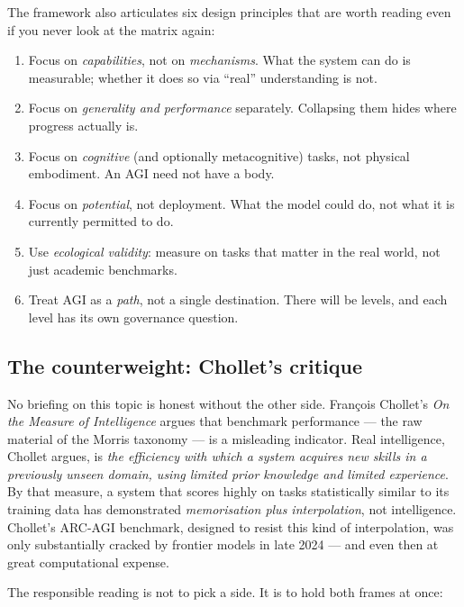 \documentclass[11pt,a4paper]{article}
\begin{document}
The framework also articulates six design principles that are worth
reading even if you never look at the matrix again:

\begin{enumerate}[leftmargin=1.4em]
  \item Focus on \emph{capabilities}, not on \emph{mechanisms}. What
        the system can do is measurable; whether it does so via
        ``real'' understanding is not.
  \item Focus on \emph{generality and performance} separately.
        Collapsing them hides where progress actually is.
  \item Focus on \emph{cognitive} (and optionally metacognitive) tasks,
        not physical embodiment. An AGI need not have a body.
  \item Focus on \emph{potential}, not deployment. What the model could
        do, not what it is currently permitted to do.
  \item Use \emph{ecological validity}: measure on tasks that matter in
        the real world, not just academic benchmarks.
  \item Treat AGI as a \emph{path}, not a single destination. There
        will be levels, and each level has its own governance question.
\end{enumerate}

\subsection{The counterweight: Chollet's critique}

No briefing on this topic is honest without the other side. Fran\c{c}ois
Chollet's \emph{On the Measure of Intelligence} \citep{chollet2019measure}
argues that benchmark performance --- the raw material of the Morris
taxonomy --- is a misleading indicator. Real intelligence, Chollet
argues, is \emph{the efficiency with which a system acquires new skills
in a previously unseen domain, using limited prior knowledge and
limited experience}. By that measure, a system that scores highly on
tasks statistically similar to its training data has demonstrated
\emph{memorisation plus interpolation}, not intelligence. Chollet's
ARC-AGI benchmark, designed to resist this kind of interpolation, was
only substantially cracked by frontier models in late 2024 --- and even
then at great computational expense.

The responsible reading is not to pick a side. It is to hold both
frames at once:
\end{document}
